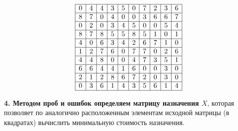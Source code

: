 \documentclass[17pt]{extarticle}
\begin{document}
\[
    \begin{array}{|*{10}{c|}}
        \hline
        0 & 4 & 4 & 3 & 5 & 0 & 7 & 2 & 3 & 6 \\
        \hline
        8 & 7 & 0 & 4 & 0 & 0 & 3 & 6 & 6 & 7 \\
        \hline
        0 & 2 & 0 & 3 & 4 & 5 & 0 & 0 & 5 & 4 \\
        \hline
        8 & 7 & 8 & 5 & 5 & 8 & 5 & 1 & 0 & 1 \\
        \hline
        4 & 0 & 6 & 3 & 4 & 2 & 6 & 7 & 1 & 0 \\
        \hline
        1 & 2 & 7 & 6 & 0 & 7 & 7 & 0 & 2 & 6 \\
        \hline
        4 & 4 & 8 & 0 & 0 & 4 & 7 & 3 & 5 & 1 \\
        \hline
        6 & 6 & 4 & 4 & 1 & 6 & 0 & 0 & 3 & 0 \\
        \hline
        2 & 1 & 2 & 8 & 6 & 7 & 2 & 0 & 3 & 0 \\
        \hline
        0 & 3 & 6 & 1 & 4 & 3 & 5 & 6 & 1 & 4 \\
        \hline
    \end{array}
\]

\textbf{4. Методом проб и ошибок определяем матрицу назначения \( X \)}, которая позволяет по аналогично расположенным элементам исходной матрицы (в квадратах) вычислить минимальную стоимость назначения.
\end{document}

